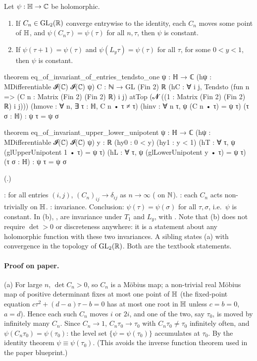 \begin{theorem}\label{ch16:thm:shimizu}
Let $\psi:\mathbb{H}\to{\mathbb{C}}$ be holomorphic.
\begin{enumerate}[label=(\alph*)]
\item If $C_n\in\mathrm{GL}_2(\mathbb{R})$ converge entrywise to the identity, each $C_n$ moves some point of $\mathbb{H}$, and
  $\psi(C_n\tau)=\psi(\tau)$ for all $n,\tau$, then $\psi$ is constant.
\item If $\psi(\tau+1)=\psi(\tau)$ and $\psi(L_y\tau)=\psi(\tau)$ for all $\tau$, for some $0<y<1$, then $\psi$ is
  constant.
\end{enumerate}
\end{theorem}
\begin{leancode}
theorem eq_of_invariant_of_entries_tendsto_one {ψ : ℍ → ℂ}
    (hψ : MDifferentiable 𝓘(ℂ) 𝓘(ℂ) ψ) {C : ℕ → GL (Fin 2) ℝ}
    (hC : ∀ i j, Tendsto (fun n => (C n : Matrix (Fin 2) (Fin 2) ℝ) i j) atTop
      (𝓝 ((1 : Matrix (Fin 2) (Fin 2) ℝ) i j)))
    (hmove : ∀ n, ∃ τ : ℍ, C n • τ ≠ τ) (hinv : ∀ n τ, ψ (C n • τ) = ψ τ) (τ σ : ℍ) :
    ψ τ = ψ σ

theorem eq_of_invariant_upper_lower_unipotent {ψ : ℍ → ℂ} (hψ : MDifferentiable 𝓘(ℂ) 𝓘(ℂ) ψ)
    {y : ℝ} (hy0 : 0 < y) (hy1 : y < 1) (hT : ∀ τ, ψ (glUpperUnipotent 1 • τ) = ψ τ)
    (hL : ∀ τ, ψ (glLowerUnipotent y • τ) = ψ τ) (τ σ : ℍ) : ψ τ = ψ σ
\end{leancode}
(.)
\begin{dictionary}
: for all entries $(i,j)$, $(C_n)_{ij}\to\delta_{ij}$ as $n\to\infty$ ( on ${\mathbb{N}}$).  :
each $C_n$ acts non-trivially on $\mathbb{H}$.  : invariance.  Conclusion: $\psi(\tau)=\psi(\sigma)$ for all
$\tau,\sigma$, i.e.\ $\psi$ is constant.  In (b), ,  are invariance under $T_1$ and $L_y$, with
.  Note that (b) does not require $\det>0$ or discreteness anywhere: it is a statement about any
holomorphic function with these two invariances.  A sibling  states (a) with
convergence in the topology of $\mathrm{GL}_2(\mathbb{R})$.  Both are the textbook statements.
\end{dictionary}
\paragraph{Proof on paper.}  (a) For large $n$, $\det C_n>0$, so $C_n$ is a M\"obius map; a non-trivial real
M\"obius map of positive determinant fixes at most one point of $\mathbb{H}$ (the fixed-point equation
$c\tau^2+(d-a)\tau-b=0$ has at most one root in $\mathbb{H}$ unless $c=b=0$, $a=d$).  Hence each such $C_n$ moves
$i$ or $2i$, and one of the two, say $\tau_0$, is moved by infinitely many $C_n$.  Since $C_n\to1$, $C_n\tau_0\to\tau_0$
with $C_n\tau_0\ne\tau_0$ infinitely often, and $\psi(C_n\tau_0)=\psi(\tau_0)$: the level set
$\{\psi=\psi(\tau_0)\}$ accumulates at $\tau_0$.  By the identity theorem $\psi\equiv\psi(\tau_0)$.  (This avoids the
inverse function theorem used in the paper blueprint.)

